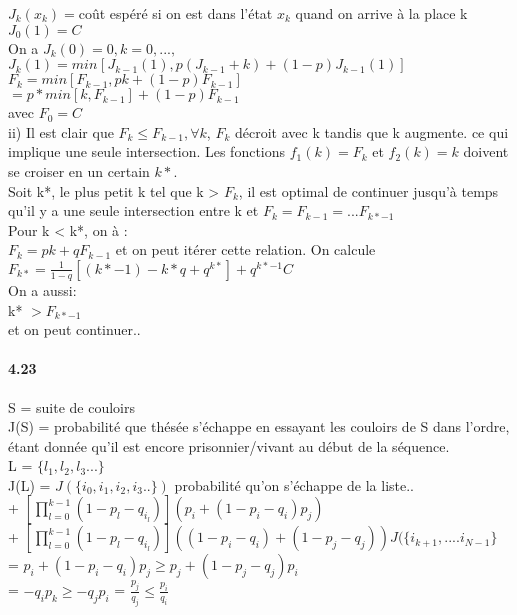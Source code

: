 \documentclass[oneside]{book}
\begin{document}
$J_k(x_k) = $coût espéré si on est dans l'état $x_k$ quand on arrive à la place k\\
$J_0(1) = C$\\
On a $J_k(0) = 0, k=0,...,$\\

$J_k(1) = min_{}[J_{k-1}(1), p(J_{k-1}+k) + (1-p)J_{k-1}(1)]$\\

$F_k = min[F_{k-1}, pk + (1-p)F_{k-1}]$\\

$ = p*min[k, F_{k-1}] + (1-p)F_{k-1}$\\

avec $F_0 = C$\\

ii) Il est clair que $F_k \leq F_{k-1}, \forall k$, $F_k$ décroit avec k tandis que k augmente. ce qui implique une seule intersection. Les fonctions $f_1(k) = F_k$ et $f_2(k) = k$ doivent se croiser en un certain $k*$. \\

Soit k*, le plus petit k tel que k > $F_k$, il est optimal de continuer jusqu'à temps qu'il y a une seule intersection entre k et $F_k = F_{k-1} = ...F_{k*-1}$\\

Pour k < k*, on à :\\

$F_k = pk + qF_{k-1}$ et on peut itérer cette relation. On calcule $F_{k*} = \frac{1}{1-q}[(k*-1) - k*q + q^{k*}]+q^{k*-1}C$\\

On a aussi:\\

k* $> F_{k*-1}$\\

et on peut continuer..

\paragraph{4.23}
S  = suite de couloirs \\

J(S) = probabilité que thésée s'échappe en essayant les couloirs de S dans l'ordre, étant donnée qu'il est encore prisonnier/vivant au début de la séquence.\\

L = $\{l_1, l_2, l_3...\}$\\

J(L) = $J(\{i_0,i_1,i_2,i_3..\})$  probabilité qu'on s'échappe de la liste.. \\
	 + $[\prod_{l = 0}^{k-1}(1-p_l-q_{i_l})](p_i + (1 - p_i - q_i)p_j)$\\
	 + $[\prod_{l = 0}^{k-1}(1-p_l-q_{i_l})]((1 - p_i - q_i) + (1 - p_j - q_j))J(\{i_{k+1},....i_{N-1}\}$\\
	 = $p_i + (1-p_i-q_i)p_j \geq p_j + (1-p_j-q_j)p_i$\\
	 = $-q_ip_k \geq -q_jp_i$ = $\frac{p_j}{q_j} \leq \frac{p_i}{q_i}$
\end{document}
